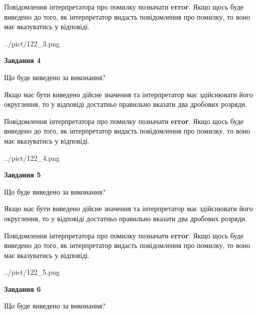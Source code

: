 \documentclass[12pt, ukrainian]{article}
\begin{document}
{\begin {Large}
Повідомлення інтерпретатора про помилку позначати \textbf{error}.
Якщо щось буде виведено до того, як інтерпретатор видасть повідомлення про помилку, 
то воно має вказуватись у відповіді. \par

\begin{center}
	{../pict/122_3.png}
\end{center}
\newpage

{\begin {center}\textbf{Завдання 4}\end {center}}\par
Що буде виведено за виконання? \par

Якщо має бути виведено дійсне значення та інтерпретатор має здійснювати його округлення, 
то у відповіді достатньо правильно вказати два дробових розряди.

Повідомлення інтерпретатора про помилку позначати \textbf{error}.
Якщо щось буде виведено до того, як інтерпретатор видасть повідомлення про помилку, 
то воно має вказуватись у відповіді. \par

\begin{center}
	{../pict/122_4.png}
\end{center}
\newpage

{\begin {center}\textbf{Завдання 5}\end {center}}\par
Що буде виведено за виконання? \par

Якщо має бути виведено дійсне значення та інтерпретатор має здійснювати його округлення, 
то у відповіді достатньо правильно вказати два дробових розряди.

Повідомлення інтерпретатора про помилку позначати \textbf{error}.
Якщо щось буде виведено до того, як інтерпретатор видасть повідомлення про помилку, 
то воно має вказуватись у відповіді. \par

\begin{center}
	{../pict/122_5.png}
\end{center}
\newpage

{\begin {center}\textbf{Завдання 6}\end {center}}\par
Що буде виведено за виконання? \par


\end{Large}}
\end{document}

